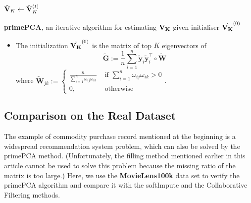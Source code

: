 \documentclass[a4paper,12pt,authoryear]{elegantpaper}
\begin{document}
    \begin{algorithm}[H]
        \KwData{$\hat{\bf V_{K}}^{(0)} \in \mathbb{O}^{d \times K}$, $K \in [d]$, $\sigma_* \in (0,\infty)$, $\kappa^* \in [0, \infty)$}
        $\hat{\bf V}_{K}\leftarrow\hat{\bf V}^{(t)}_{K}$\;
        \caption{\textbf{primePCA}, an iterative algorithm for estimating $\bf{V}_K$ given initialiser $\hat{\bf V_{K}}^{(0)}$ \citep{zhu_high-dimensional_2019}}
        \label{algorithm:primePCA}
    \end{algorithm}
    \begin{itemize}
        \item The initialization $\hat{\bf V_{K}}^{(0)}$ is the matrix of top $K$ eigenvectors of
        \begin{equation*}
            \tilde{\mathbf{G}}:=\frac{1}{n} \sum_{i=1}^{n} \tilde{\mathbf{y}}_{i} \tilde{\mathbf{y}}_{i}^{\top} \circ \tilde{\mathbf{W}}
        \end{equation*}
        where $\tilde{\mathbf{W}}_{j k}:=\left\{\begin{array}{ll}\frac{n}{\sum_{i=1}^{n} \omega_{i j} \omega_{i k}} & \text { if } \sum_{i=1}^{n} \omega_{i j} \omega_{i k}>0 \\ 0, & \text { otherwise }\end{array}\right.$.
    \end{itemize}

    \subsection{Comparison on the Real Dataset}

    The example of commodity purchase record mentioned at the beginning is a widespread recommendation system problem, which can also be solved by the primePCA method. (Unfortunately, the filling method mentioned earlier in this article cannot be used to solve this problem because the missing ratio of the matrix is too large.) Here, we use the \textbf{MovieLens100k} data set to verify the primePCA algorithm and compare it with the softImpute and the Collaborative Filtering methods.
\end{document}

